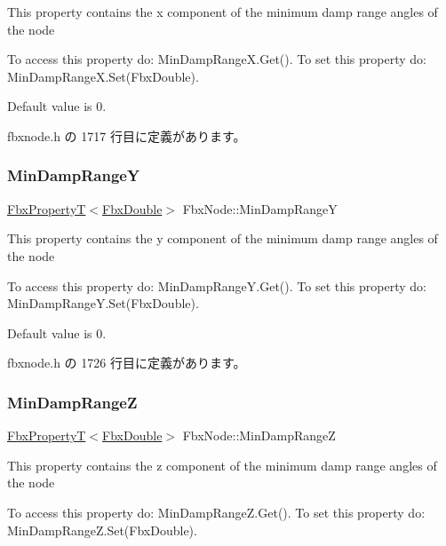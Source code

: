This property contains the x component of the minimum damp range angles of the node

To access this property do\+: Min\+Damp\+Range\+X.\+Get(). To set this property do\+: Min\+Damp\+Range\+X.\+Set(\+Fbx\+Double).

Default value is 0. 

 fbxnode.\+h の 1717 行目に定義があります。

\mbox{\label{class_fbx_node_a27155ddcecae7a73a9fd249ccb9604f8}} 
\subsubsection{\texorpdfstring{Min\+Damp\+RangeY}{MinDampRangeY}}
{\footnotesize\ttfamily \hyperlink{class_fbx_property_t}{Fbx\+PropertyT}$<$\hyperlink{fbxtypes_8h_a171e72a1c46fc15c1a6c9c31948c1c5b}{Fbx\+Double}$>$ Fbx\+Node\+::\+Min\+Damp\+RangeY}

This property contains the y component of the minimum damp range angles of the node

To access this property do\+: Min\+Damp\+Range\+Y.\+Get(). To set this property do\+: Min\+Damp\+Range\+Y.\+Set(\+Fbx\+Double).

Default value is 0. 

 fbxnode.\+h の 1726 行目に定義があります。

\mbox{\label{class_fbx_node_ae1e9a899c7fcc6e2e8445a4dbc127720}} 
\subsubsection{\texorpdfstring{Min\+Damp\+RangeZ}{MinDampRangeZ}}
{\footnotesize\ttfamily \hyperlink{class_fbx_property_t}{Fbx\+PropertyT}$<$\hyperlink{fbxtypes_8h_a171e72a1c46fc15c1a6c9c31948c1c5b}{Fbx\+Double}$>$ Fbx\+Node\+::\+Min\+Damp\+RangeZ}

This property contains the z component of the minimum damp range angles of the node

To access this property do\+: Min\+Damp\+Range\+Z.\+Get(). To set this property do\+: Min\+Damp\+Range\+Z.\+Set(\+Fbx\+Double).

